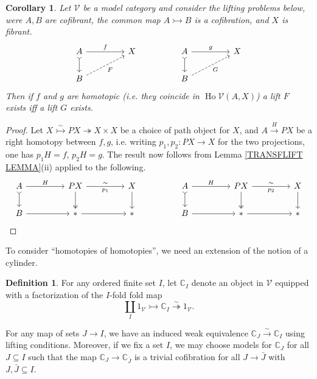 \documentclass[a4paper,10pt
,draft
]{article}%
\numberwithin{equation}{section}
\numberwithin{figure}{section}
\newtheorem{corollary}[equation]{Corollary}%
\theoremstyle{definition} %
\newtheorem{definition}[equation]{Definition}%
\DeclareMathOperator{\Ho}{Ho}
\newcommand{\V}{\ensuremath{\mathcal V}}
\newcommand{\1}{\ensuremath{\mathbbm 1}}%
\begin{document}
\begin{corollary}\label{LIFTEQUIV COR}
Let $\V$ be a model category and
consider the lifting problems below, were $A,B$ are cofibrant, 
the common map $A \rightarrowtail B$ is a cofibration, and $X$ is fibrant.
\begin{equation}
\begin{tikzcd}[column sep = 45pt]
	A
	\ar[rightarrowtail]{d}
	\arrow{r}{f}
&
	X
&%
	A
	\ar[rightarrowtail]{d}
	\arrow{r}{g}
&
	X
\\
	B \ar[dashed]{ru}[swap]{F}
&
&%
	B \ar[dashed]{ru}[swap]{G}
&
\end{tikzcd}
\end{equation}
Then if $f$ and $g$ are homotopic 
(i.e. they coincide in $\Ho \V(A,X)$)
a lift $F$ exists iff a lift $G$ exists.
\end{corollary}

\begin{proof}
Let 
$X \overset{\sim}{\rightarrowtail} PX 
\twoheadrightarrow X \times X$
be a choice of path object for $X$,
and $A \xrightarrow{H} PX$
be a right homotopy between $f,g$,
i.e. writing $p_1,p_2 \colon PX \to X$ for the two projections,
one has
$p_1H=f$, $p_2H=g$.
The result now follows from Lemma \ref{TRANSFLIFT LEMMA}(ii)
applied to the following.
\begin{equation}
\begin{tikzcd}[column sep = 45pt]
	A
	\ar[rightarrowtail]{d}
	\arrow{r}{H}
&
	PX
	\arrow[twoheadrightarrow]{d} \ar{r}{\sim}[swap]{p_1}
&
	X \ar{d}
&%
	A
	\ar[rightarrowtail]{d}
	\arrow{r}{H}
&
	PX
	\arrow[twoheadrightarrow]{d} \ar{r}{\sim}[swap]{p_2}
&
	X \ar{d}
\\
	B
	\arrow{r}
&
	\**\ar{r}
&
	\**
&%
	B
	\arrow{r}
&
	\**\ar{r}
&
	\**
\end{tikzcd}
\end{equation}
\end{proof}

To consider ``homotopies of homotopies'', we need an extension of the notion of a cylinder.
\begin{definition}
      For any ordered finite set $I$, let $\mathbb C_I$ denote an object in $\V$ equipped with a factorization of the $I$-fold fold map
      \[
            \coprod_I 1_\V \rightarrowtail \mathbb C_I \overset{\sim}{\twoheadrightarrow} 1_\V.
      \]
      
      For any map of sets $J \to I$, we have an induced weak equivalence $\mathbb C_J \xrightarrow{\sim} \mathbb C_I$ using lifting conditions.
      Moreover, if we fix a set $I$, we may choose models for $\mathbb C_J$ for all $J \subseteq I$ such that
      the map $\mathbb C_J \to \mathbb C_{\bar J}$ is a trivial cofibration for all $J \to \bar J$ with $J,\bar J \subseteq I$.
\end{definition}
\end{document}
